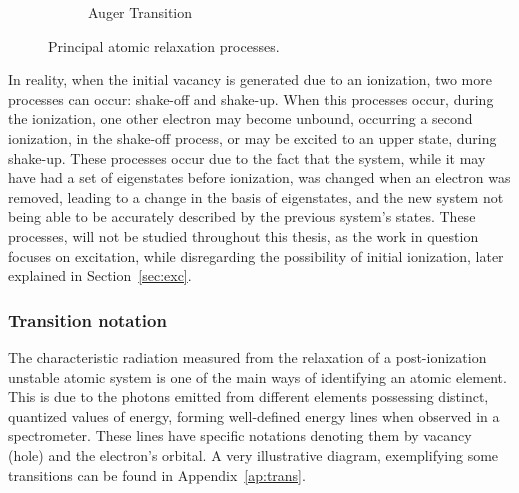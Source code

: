 \begin{figure}[h!]
\begin{subfigure}{0.49\textwidth}
        \caption{Auger Transition}
    \end{subfigure}
    \caption{Principal atomic relaxation processes.}
\end{figure}

In reality, when the initial vacancy is generated due to an ionization, two more processes can occur: shake-off and shake-up. When this processes occur, during the ionization, one other electron may become unbound, occurring a second ionization, in the shake-off process, or may be excited to an upper state, during shake-up.
These processes occur due to the fact that the system, while it may have had a set of eigenstates before ionization, was changed when an electron was removed, leading to a change in the basis of eigenstates, and the new system not being able to be accurately described by the previous system's states.  
These processes, will not be studied throughout this thesis, as the work in question focuses on excitation, while disregarding the possibility of initial ionization, later explained in Section~\ref{sec:exc}.


\subsubsection{Transition notation}

The characteristic radiation measured from the relaxation of a post-ionization unstable atomic system is one of the main ways of identifying an atomic element. This is due to the photons emitted from different elements possessing distinct, quantized values of energy, forming well-defined energy lines when observed in a spectrometer. These lines have specific notations denoting them by vacancy (hole) and the electron's orbital.
A very illustrative diagram, exemplifying some transitions can be found in Appendix~\ref{ap:trans}.

